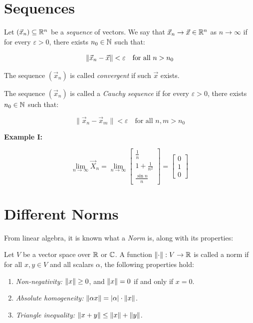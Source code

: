 \section{Sequences}

Let \( (\vec{x}_n) \subseteq \mathbb{R}^n \) be a \emph{sequence} of vectors. We say that 
\( \vec{x}_n \to \vec{x} \in \mathbb{R}^n \) as \( n \to \infty \) if for every \( \varepsilon > 0 \), 
there exists \( n_0 \in \mathbb{N} \) such that:
    
\[
    \left\| \vec{x}_n - \vec{x} \right\| < \varepsilon \quad \text{for all } n > n_0
\]

The sequence \( (\vec{x}_n) \) is called \emph{convergent} if such \( \vec{x} \) exists.

The sequence \( (\vec{x}_n) \) is called a \emph{Cauchy sequence} if for every \( \varepsilon > 0 \), 
there exists \( n_0 \in \mathbb{N} \) such that:

\[
    \|\vec{x}_n - \vec{x}_m\| < \varepsilon \quad \text{for all } n, m > n_0
\]

\textbf{Example I:}

\[
    \lim_{n \to \infty} \vec{X}_n = \lim_{n \to \infty} \begin{bmatrix} \frac{1}{n} \\
    1 + \frac{1}{n^2} \\ \frac{\sin n}{n}\end{bmatrix} = \begin{bmatrix}
        0 \\ 1 \\ 0
    \end{bmatrix}
\]

\section{Different Norms}

From linear algebra, it is known what a \emph{Norm} is, along with its properties:

Let \( V \) be a vector space over \( \mathbb{R} \) or \( \mathbb{C} \). A function 
\( \left\| \cdot \right\|: V \to \mathbb{R} \) is called a norm if for all \( x, y \in V \) and all scalars 
\( \alpha \), the following properties hold:

\begin{enumerate}
    
    \item \emph{Non-negativity:} \( \left\| x \right\| \geq 0 \), and \( \left\| x \right\| = 0 \) if and only if \( x = 0 \).
    
    \item \emph{Absolute homogeneity:} \( \left\| \alpha x \right\| = |\alpha| \cdot \left\| x \right\| \).
    
    \item \emph{Triangle inequality:} \( \left\| x + y \right\| \leq \left\| x \right\| + \left\| y \right\| \).

\end{enumerate}

